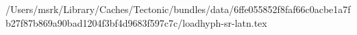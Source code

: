 /Users/msrk/Library/Caches/Tectonic/bundles/data/6ffe055852f8faf66c0acbe1a7fb27f87b869a90bad1204f3bf4d9683f597c7c/loadhyph-sr-latn.tex